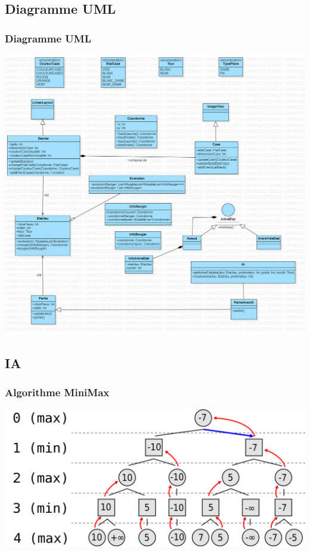 \documentclass{beamer}
\begin{document}
\subsection{Diagramme UML}
\begin{frame}
  \frametitle{Diagramme UML}
  \begin{center}
    \includegraphics[scale=0.15]{diagramme_android.png}
  \end{center}
\end{frame}
%
%

\subsection{IA}

\begin{frame}
  \frametitle{Algorithme MiniMax}

  \begin{center}
    \includegraphics[scale=0.12]{minimax.png}
  \end{center}

  

\end{frame}
\end{document}
